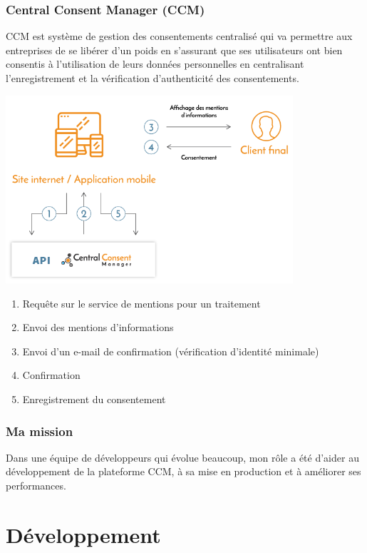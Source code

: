 \documentclass[12pt, a4paper]{report}
\newcommand\tab[1][1cm]{\hspace*{#1}}
\begin{document}
            \subsection{Central Consent Manager (CCM)}
                \tab{} CCM est système de gestion des consentements centralisé qui va permettre aux entreprises de se libérer d'un poids en s'assurant que ses utilisateurs ont bien consentis à l'utilisation de leurs données personnelles en centralisant l'enregistrement et la vérification d'authenticité des consentements.
                \begin{center}
                    \includegraphics[width=0.8\textwidth]{ccm.png}
                \end{center}
                \begin{enumerate}
                    \item Requête sur le service de mentions pour un traitement
                    \item Envoi des mentions d'informations
                    \item Envoi d'un e-mail de confirmation (vérification d'identité minimale)
                    \item Confirmation
                    \item Enregistrement du consentement
                \end{enumerate}
            \subsection{Ma mission}
                \tab{} Dans une équipe de développeurs qui évolue beaucoup, mon rôle a été d'aider au développement de la plateforme CCM, à sa mise en production et à améliorer ses performances.
    \chapter{Développement}
\end{document}
